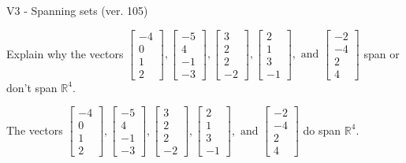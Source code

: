 \begin{exercise}
  \begin{exerciseTitle}V3 - Spanning sets (ver. 105)\end{exerciseTitle}
  \begin{exerciseStatement}
    Explain why the vectors \(\left[\begin{array}{r}
-4 \\
0 \\
1 \\
2
\end{array}\right] , \left[\begin{array}{r}
-5 \\
4 \\
-1 \\
-3
\end{array}\right] , \left[\begin{array}{r}
3 \\
2 \\
2 \\
-2
\end{array}\right] , \left[\begin{array}{r}
2 \\
1 \\
3 \\
-1
\end{array}\right] , \text{ and } \left[\begin{array}{r}
-2 \\
-4 \\
2 \\
4
\end{array}\right]\) span or don't span \(\mathbb{R}^4\). 
	


  \end{exerciseStatement}
  \begin{exerciseAnswer}
   The vectors \(\left[\begin{array}{r}
-4 \\
0 \\
1 \\
2
\end{array}\right] , \left[\begin{array}{r}
-5 \\
4 \\
-1 \\
-3
\end{array}\right] , \left[\begin{array}{r}
3 \\
2 \\
2 \\
-2
\end{array}\right] , \left[\begin{array}{r}
2 \\
1 \\
3 \\
-1
\end{array}\right] , \text{ and } \left[\begin{array}{r}
-2 \\
-4 \\
2 \\
4
\end{array}\right]\) 
  	 do  
	span \(\mathbb{R}^4\).
  



\end{exerciseAnswer}
\end{exercise}
